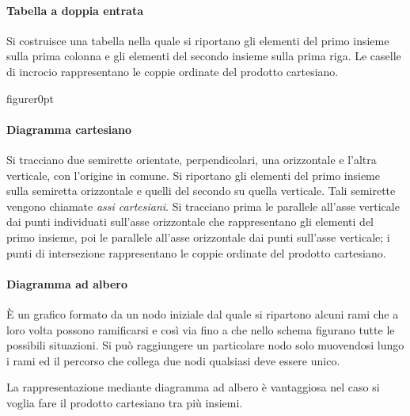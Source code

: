 \paragraph{Tabella a doppia entrata}

Si costruisce una tabella nella quale si riportano gli elementi del
primo insieme sulla prima colonna e gli elementi del secondo insieme
sulla prima riga. Le caselle di incrocio rappresentano le coppie
ordinate del prodotto cartesiano.
\begin{center}
 
\end{center}

\begin{wrapfloat}{figure}{r}{0pt}
 
\end{wrapfloat}

\paragraph{Diagramma cartesiano}
Si tracciano due semirette orientate, perpendicolari, una orizzontale e l'altra
verticale, con l'origine
in comune. Si riportano gli elementi del primo insieme sulla semiretta
orizzontale e quelli del secondo su quella verticale. Tali semirette
vengono chiamate \emph{assi cartesiani}. Si tracciano prima le
parallele all'asse verticale dai punti individuati
sull'asse orizzontale che rappresentano gli elementi
del primo insieme, poi le parallele all'asse
orizzontale dai punti sull'asse verticale; i punti di
intersezione rappresentano le coppie ordinate del prodotto
cartesiano.

\paragraph{Diagramma ad albero}
\`E un grafico formato da un nodo iniziale dal quale si ripartono alcuni
rami che a loro volta possono ramificarsi e così via fino a che nello
schema figurano tutte le possibili situazioni.
Si può raggiungere un particolare nodo solo muovendosi lungo i rami ed
il percorso che collega due nodi qualsiasi deve essere unico.

La rappresentazione mediante diagramma ad albero è vantaggiosa nel
caso si voglia fare il prodotto cartesiano tra più insiemi.
\begin{center}

\end{center}

